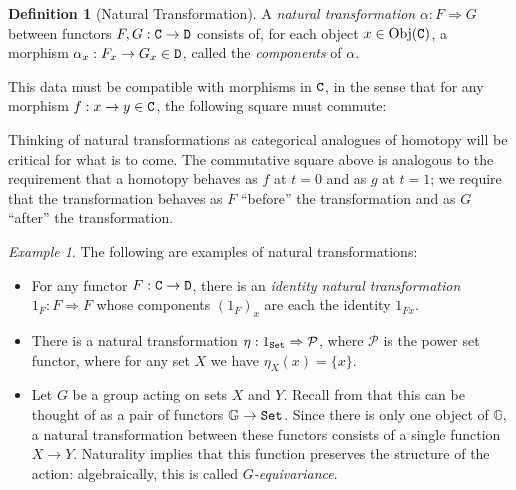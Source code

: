\documentclass[11 pt]{amsart}
\theoremstyle{plain}   %
\theoremstyle{definition}
\newtheorem{defn}{Definition}[section]
\theoremstyle{remark}
\newtheorem{ex}{Example}[section]
\numberwithin{equation}{section}
\def\cP{\mathcal{P}}
\def\GG{\mathbb{G}}
\def\nat{\Rightarrow}
\newcommand{\punctuation}[1]{\makebox[0pt][l]{#1}}
\newcommand{\cat}[1]{{\normalfont\texttt{#1}}}
\newcommand{\Obj}[1]{\text{Obj}(\cat{#1})}
\begin{document}
\begin{defn}[Natural Transformation]\label{natural transformation}
	A \emph{natural transformation} $\alpha: F\nat G$ between
	functors $F,G:\cat{C}\rightarrow\cat{D}$ consists of, for each
	object $x\in\Obj{C}$, a morphism $\alpha_x: F_x\rightarrow G_x\in \cat{D}$,
	called the \emph{components} of $\alpha$.

	This data must be compatible with morphisms in $\cat{C}$, in the sense that
	for any morphism $f: x\rightarrow y\in\cat{C}$, the following square must
	commute:
	\begin{figure}[H]
		\centering
	\end{figure}
\end{defn}

Thinking of natural transformations as categorical analogues of homotopy will be
critical for what is to come. The commutative square above is analogous to the
requirement that a homotopy behaves as $f$ at $t=0$ and as $g$ at $t=1$; we
require that the transformation behaves as $F$ ``before'' the transformation and
as $G$ ``after'' the transformation.

\begin{ex} The following are examples of natural transformations:
	\begin{itemize}
		\item For any functor $F: \cat{C}\rightarrow\cat{D}$, there is an \emph{identity
			      natural transformation} $1_F: F\nat F$ whose components $(1_F)_x$ are each
		      the identity $1_{Fx}$.
		\item There is a natural transformation $\eta: 1_{\cat{Set}}\nat\cP$,
		      where $\cP$ is the power set functor, where for any set $X$ we have
		      $\eta_X(x) = \{x\}$.
		\item Let $G$ be a group acting on sets $X$ and $Y$. Recall from
		       that this can be thought of as a pair of functors
		      $\GG\rightarrow\cat{Set}$. Since there is only one object of $\GG$, a
		      natural transformation between these functors consists of a single
		      function $X\rightarrow Y$. Naturality implies that this function preserves
		      the structure of the action: algebraically, this is called
		      \emph{$G$-equivariance}.
	\end{itemize}
\end{ex}
\end{document}
